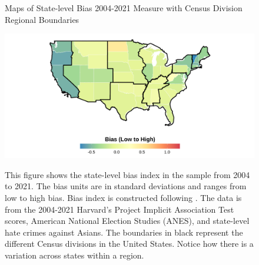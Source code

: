 \begin{center}
\begin{figure}[H]
\caption{Maps of State-level Bias 2004-2021 Measure with Census Division Regional Boundaries}
\includegraphics[width=\textwidth]{figure/Average_Skinmap.png} 
\label{fig:iat-map-all}
\caption*{\footnotesize{This figure shows the state-level bias index in the sample from 2004 to 2021. The bias units are in standard deviations and ranges from low to high bias. Bias index is constructed following \textcite{lubotskyInterpretationRegressionsMultiple2006}. The data is from the 2004-2021 Harvard's Project Implicit Association Test scores, American National Election Studies (ANES), and state-level hate crimes against Asians. The boundaries in black represent the different Census divisions in the United States. Notice how there is a variation across states within a region.}}
\end{figure}
\end{center}

\pagebreak
\newpage

